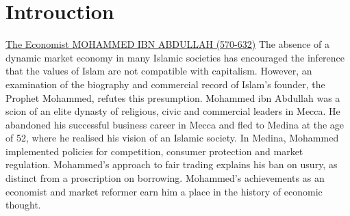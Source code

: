 \section{Introuction}
\href{https://icp.summon.serialssolutions.com/2.0.0/link/0/eLvHCXMwrV1db9MwFL0a6wNICMYAUQYoT3w8tHPt3Lh5TNukYWoH2jpN4sWyHRehiTK1Rdoj_4F_yC_BN3UjOvGEeIuU2FJ0fK_PTc65BhC8yzq3coKbpzLlzm8QLkYjetazftrqcK6lZ7TkG87H6cciPj8Tkz0ot9aYTbuI5vsbBUqdvinetVkd_yHMIQuRr7FYkGtxlrCuJ5ct-tGA-9AajM4-FU2S5lifnecrECQTPu6KfP46V5O0WwTAzQ4lbYitCIm2eAhXjb_HXne_VF8bf_Wtho__4z0P4EEgsFG2WXGPYM8tDuHu1t-8OoSDIKnzD4XE8RiOZ2UehTMTz2fR9EOZTaf5KHo_OI2ywehiMsnK6C1K9uvHz0Twd0_goshnw7ITjmrofOZIBaidG4Pk16skam4SURkrekJTzWn8LdnrSVt5coGoNTIzN8xJak7vHClNxVO4r0nSv1jX1r_qGUSVpx-JdTK2lsVWCy37fmDKEysSNMy24Q3hoSgS10ttdTAUfFs46mmlMk7NAf0OnLbhdQ2Zut508FB6eUWCNonq8nSsyuH05PKkHKukDUdbTFWI5ZXqI9JZPv24DbJGpplmp4DqK0JFESqqRkXdqHyYFXT5_J9HHsG9zVdsUr29gP318rt7CXf8knoVlvRvpSXyjQ}{The Economist  MOHAMMED IBN ABDULLAH (570-632)}
The absence of a dynamic market economy in many Islamic societies has encouraged the inference that the values of Islam are not compatible with capitalism. However, an examination of the biography and commercial record of Islam's founder, the Prophet Mohammed, refutes this presumption. Mohammed ibn Abdullah was a scion of an elite dynasty of religious, civic and commercial leaders in Mecca. He abandoned his successful business career in Mecca and fled to Medina at the age of 52, where he realised his vision of an Islamic society. In Medina, Mohammed implemented policies for competition, consumer protection and market regulation. Mohammed's approach to fair trading explains his ban on usury, as distinct from a proscription on borrowing. Mohammed's achievements as an economist and market reformer earn him a place in the history of economic thought.


